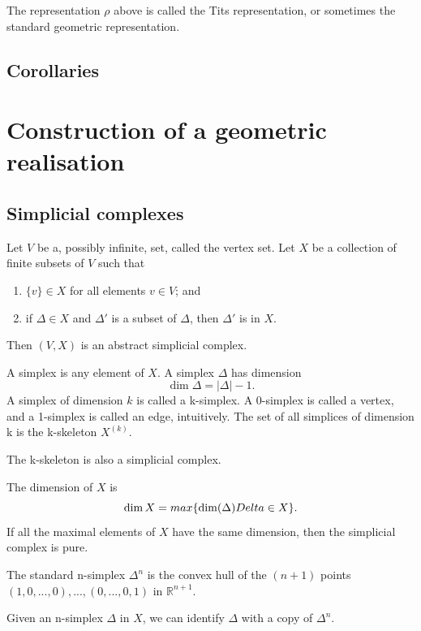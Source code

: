 \documentclass[11pt]{article}
\begin{document}
\begin{definition}
    The representation $\rho$ above is called the Tits representation, or sometimes the standard geometric representation. 
\end{definition}

\subsection{Corollaries}

\bigbreak

\section{Construction of a geometric realisation}
\subsection{Simplicial complexes}
\begin{definition}
    Let $V$ be a, possibly infinite, set, called the vertex set. Let $X$ be a collection of finite subsets of $V$ such that 
    \begin{enumerate}
        \item $\{v\}\in X$ for all elements $v\in V$; and
        \item if $\Delta \in X$ and $\Delta'$ is a subset of $\Delta$, then $\Delta'$ is in $X$.
    \end{enumerate}
    Then $(V,X)$ is an abstract simplicial complex.
\end{definition}

\begin{definition}
    A simplex is any element of $X$. A simplex $\Delta$ has dimension 
    \[\dim \Delta = |\Delta| -1.\]
    A simplex of dimension $k$ is called a k-simplex. A 0-simplex is called a vertex, and a 1-simplex is called an edge, intuitively. The set of all simplices of dimension k is the k-skeleton $X^{(k)}.$ 
\end{definition}

\begin{lemma}
    The k-skeleton is also a simplicial complex. 
\end{lemma}

\begin{definition}
    The dimension of $X$ is
    \[\dim X = max\{\dim(\Delta)\\Delta \in X\}.\]
    If all the maximal elements of $X$ have the same dimension, then the simplicial complex is pure. 
\end{definition}
\begin{definition}
    The standard n-simplex $\Delta^n$ is the convex hull of the $(n+1)$ points $(1,0,...,0),...,(0,...,0,1)$ in $\mathbb{R}^{n+1}$.
\end{definition}
Given an n-simplex $\Delta$ in $X$, we can identify $\Delta$ with a copy of $\Delta^n$. 
\end{document}
